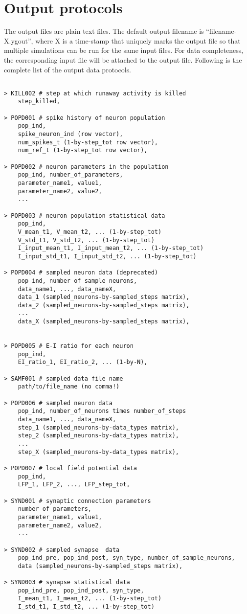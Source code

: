\documentclass{article}
\begin{document}
\section{Output protocols}
\label{sec:Output protocols}
The output files are plain text files.
The default output filename is ``filename-X.ygout'', where X is a time-stamp that uniquely marks the output file so that multiple simulations can be run for the same input files.
For data completeness, the corresponding input file will be attached to the output file.
Following is the complete list of the output data protocols.
\begin{lstlisting}

> KILL002 # step at which runaway activity is killed
	step_killed,

> POPD001 # spike history of neuron population
	pop_ind,
	spike_neuron_ind (row vector),
	num_spikes_t (1-by-step_tot row vector),
	num_ref_t (1-by-step_tot row vector),

> POPD002 # neuron parameters in the population
	pop_ind, number_of_parameters,
	parameter_name1, value1,
	parameter_name2, value2,
	...

> POPD003 # neuron population statistical data
	pop_ind,
	V_mean_t1, V_mean_t2, ... (1-by-step_tot)
	V_std_t1, V_std_t2, ... (1-by-step_tot)
	I_input_mean_t1, I_input_mean_t2, ... (1-by-step_tot)
	I_input_std_t1, I_input_std_t2, ... (1-by-step_tot)
	
> POPD004 # sampled neuron data (deprecated)
	pop_ind, number_of_sample_neurons,
	data_name1, ..., data_nameX,
	data_1 (sampled_neurons-by-sampled_steps matrix),
	data_2 (sampled_neurons-by-sampled_steps matrix),
	...
	data_X (sampled_neurons-by-sampled_steps matrix),


> POPD005 # E-I ratio for each neuron
	pop_ind,
	EI_ratio_1, EI_ratio_2, ... (1-by-N),
	
> SAMF001 # sampled data file name
	path/to/file_name (no comma!)

> POPD006 # sampled neuron data
	pop_ind, number_of_neurons times number_of_steps
	data_name1, ..., data_nameX,
	step_1 (sampled_neurons-by-data_types matrix),
	step_2 (sampled_neurons-by-data_types matrix),
	...
	step_X (sampled_neurons-by-data_types matrix),
	
> POPD007 # local field potential data
	pop_ind, 
	LFP_1, LFP_2, ..., LFP_step_tot,
	
> SYND001 # synaptic connection parameters
	number_of_parameters,
	parameter_name1, value1,
	parameter_name2, value2,
	...

> SYND002 # sampled synapse  data
	pop_ind_pre, pop_ind_post, syn_type, number_of_sample_neurons,
	data (sampled_neurons-by-sampled_steps matrix),

> SYND003 # synapse statistical data
	pop_ind_pre, pop_ind_post, syn_type,
	I_mean_t1, I_mean_t2, ... (1-by-step_tot)
	I_std_t1, I_std_t2, ... (1-by-step_tot)
	
	

\end{lstlisting}

{}

\end{document}
